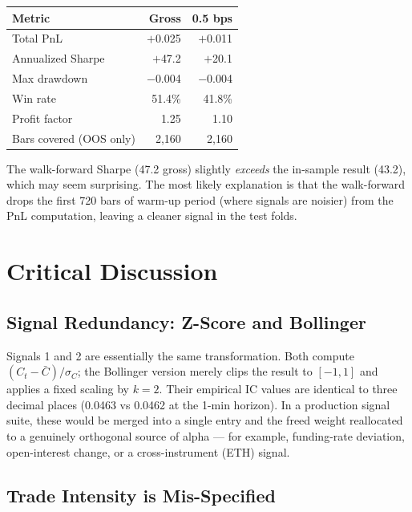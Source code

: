 \documentclass[11pt, a4paper]{article}
\begin{document}
\begin{center}
\begin{tabular}{lrr}
\toprule
\textbf{Metric} & \textbf{Gross} & \textbf{0.5 bps} \\
\midrule
Total PnL                 & $+$0.025 & $+$0.011 \\
Annualized Sharpe         & $+$47.2  & $+$20.1  \\
Max drawdown              & $-$0.004 & $-$0.004 \\
Win rate                  & 51.4\%   & 41.8\%   \\
Profit factor             & 1.25     & 1.10     \\
Bars covered (OOS only)   & 2{,}160  & 2{,}160  \\
\bottomrule
\end{tabular}
\end{center}

The walk-forward Sharpe (47.2 gross) slightly \textit{exceeds} the in-sample
result (43.2), which may seem surprising.  The most likely explanation is
that the walk-forward drops the first 720 bars of warm-up period (where
signals are noisier) from the PnL computation, leaving a cleaner signal in
the test folds.

\section{Critical Discussion}
\label{sec:discussion}

\subsection{Signal Redundancy: Z-Score and Bollinger}

Signals 1 and 2 are essentially the same transformation.  Both compute
$(C_t - \bar{C}) / \sigma_C$; the Bollinger version merely clips the result
to $[-1, 1]$ and applies a fixed scaling by $k=2$.  Their empirical IC values
are identical to three decimal places (0.0463 vs 0.0462 at the 1-min horizon).
In a production signal suite, these would be merged into a single entry and
the freed weight reallocated to a genuinely orthogonal source of alpha ---
for example, funding-rate deviation, open-interest change, or a cross-instrument
(ETH) signal.

\subsection{Trade Intensity is Mis-Specified}
\end{document}

